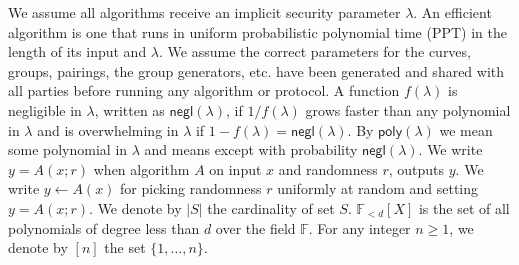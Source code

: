 \noindent We assume all algorithms receive an implicit security parameter $\lambda$. 
An efficient algorithm is one that runs in uniform probabilistic polynomial time (PPT) in the length of its input and $\lambda$. 
We assume the correct parameters for the curves, groups, pairings, the group generators, etc. have been generated and shared with all parties before running any algorithm or protocol. 
A function $f(\lambda)$ is negligible in $\lambda$, written as $\mathsf{negl}(\lambda)$, if $1/f(\lambda)$ grows faster than 
any polynomial in $\lambda$ and is overwhelming in $\lambda$ if $1-f(\lambda)=\mathsf{negl}(\lambda)$. By $\mathsf{poly}(\lambda)$ 
we mean some polynomial in $\lambda$ and \ewnp means except with probability $\mathsf{negl}(\lambda)$.
We write $y = A(x; r)$ when algorithm $A$ on input $x$ and randomness $r$, outputs $y$.
We write $y \leftarrow A(x)$ for picking randomness $r$ uniformly at random and setting $y = A(x; r)$. We denote by $|S|$ the cardinality of set $S$. 
$\mathbb{F}_{<d}[X]$ is the set of all polynomials of degree less than $d$ over the field $\mathbb{F}$. For any integer 
$n \geq 1$, we denote by $[n]$ the set $\{1, \ldots, n\}$.
\vspace{-0.015in}

